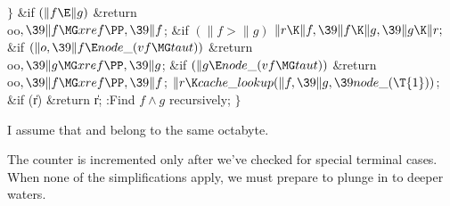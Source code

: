 \4${}\}{}$\2\6
\&{if} ${}(\|f\E\|g){}$\1\5
\&{return} \\{oo}${},\39\|f\MG\\{xref}\PP,\39\|f{}$;\2\6
\&{if} ${}(\|f>\|g){}$\1\5
${}\|r\K\|f,\39\|f\K\|g,\39\|g\K\|r;{}$\2\6
\&{if} ${}(\|o,\39\|f\E\\{node\_}(\\{vf}\MG\\{taut})){}$\1\5
\&{return} \\{oo}${},\39\|g\MG\\{xref}\PP,\39\|g{}$;\2\6
\&{if} ${}(\|g\E\\{node\_}(\\{vf}\MG\\{taut})){}$\1\5
\&{return} \\{oo}${},\39\|f\MG\\{xref}\PP,\39\|f{}$;\2\6
${}\|r\K\\{cache\_lookup}(\|f,\39\|g,\39\\{node\_}(\T{1})){}$;\6
\&{if} (\|r)\1\5
\&{return} \|r;\2\6
:Find $f\land g$ recursively\X;\6
\4${}\}{}$\2\par
\fi

I assume that  and 
belong to the same octabyte.

The  counter is incremented only after we've checked for
special terminal cases. When none of the simplifications apply,
we must prepare to plunge in to deeper waters.


